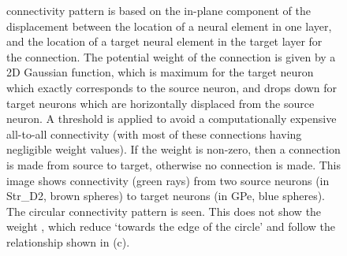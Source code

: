 \documentclass{frontiersSCNS}
\begin{document}
\begin{figure}[!ht]
{connectivity pattern is based on the in-plane component of the
displacement between
the location of a neural element in one layer, and the location of a
target neural element in the target layer for the connection. The
potential weight of the connection is given by a 2D Gaussian function,
which is maximum for the target neuron which exactly corresponds to
the source neuron, and drops down for target neurons which are
horizontally displaced from the source neuron. A threshold is applied
to avoid a computationally expensive all-to-all connectivity (with
most of these connections having negligible weight values).  If the
weight is non-zero, then a connection is made from source to target,
otherwise no connection is made.  This
image shows connectivity (green rays) from two source neurons (in
Str\_D2, brown spheres) to target neurons (in GPe, blue spheres). The
circular connectivity pattern is seen. This does not show the weight
, which reduce `towards the edge of the circle' and follow the
relationship shown in (c).}
\label{fig:ccg_model}
\end{figure}
\end{document}
